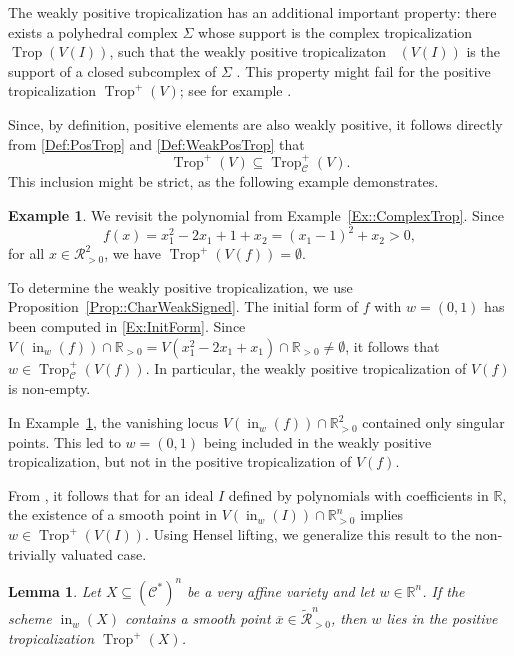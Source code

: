 \documentclass{article}
\newtheorem{lemma}[theorem]{Lemma}
\theoremstyle{definition}
\newtheorem{example}[theorem]{Example}
\DeclareMathOperator{\Trop}{Trop}
\DeclareMathOperator{\Tropw}{Trop_\mathcal{C}^+}
\newcommand{\R}{\mathbb{R}}
\newcommand{\RR}{\mathcal{R}}
\newcommand{\CC}{\mathcal{C}}
\newcommand{\inw}{\operatorname{in}_w}
\begin{document}
The weakly positive tropicalization has an additional important property: there exists a polyhedral complex $\Sigma$ whose support is the complex tropicalization $\Trop(V(I))$, such that the weakly positive tropicalizaton $\Tropw(V(I))$ is the support of a closed subcomplex of $\Sigma$ \cite[Corollary 2.4]{SpeyerWilliams::PosGrassmannian}. This property might fail for the positive tropicalization $\Trop^+(V)$; see for example \cite[Figure 7]{Alessandrini::LogLimit}.

Since, by definition, positive elements are also weakly positive, it follows directly from \eqref{Def:PosTrop} and \eqref{Def:WeakPosTrop} that
\[\Trop^+(V) \subseteq \Trop_\CC^+(V).\]
This inclusion might be strict, as the following example demonstrates.


\begin{example}
\label{Ex:SingTrop}
We revisit the polynomial from Example~\ref{Ex::ComplexTrop}. Since 
\[ f(x) =  x_1^2-2x_1+1 + x_2 = (x_1 - 1)^2 + x_2 > 0,\]
for all $x \in \mathcal{R}_{>0}^2$, we have $\Trop^+(V(f)) = \emptyset$.

To determine the weakly positive tropicalization, we use Proposition~\ref{Prop::CharWeakSigned}. The initial form of $f$ with $w = (0,1)$  has been computed in \eqref{Ex:InitForm}. Since $V(\inw(f)) \cap \mathbb{R}_{>0} = V(x_1^2 - 2x_1 +x_1)  \cap \mathbb{R}_{>0} \neq \emptyset$, it follows that $ w \in \Trop_{\mathcal{C}}^+(V(f))$. In particular, the weakly positive tropicalization of $V(f)$ is non-empty. 
\end{example}

In Example~\ref{Ex:SingTrop}, the vanishing locus $V(\inw(f)) \cap \mathbb{R}^2_{>0}$ contained only singular points.  This led to $w = (0,1)$ being included in the weakly positive tropicalization, but not in the positive tropicalization of $V(f)$.

From \cite[Lemma 2.6]{Vinzant::RealRadical}, it follows that for an ideal $I$ defined by polynomials with coefficients in $\mathbb{R}$, the existence of a smooth point in $V(\inw(I)) \cap \mathbb{R}^n_{>0}$ implies $w \in \Trop^+(V(I))$. Using Hensel lifting, we generalize this result to the non-trivially valuated case.

\begin{lemma}
\label{Lemma: Hensel lifting}
    Let $X\subseteq (\CC^*)^n$ be a very affine variety and let $w \in \R^n$. If the scheme $\inw(X)$ contains a smooth point $\overline{x} \in \widetilde{\RR}^n_{>0}$, then $w$ lies in the positive tropicalization $\Trop^+(X)$.
\end{lemma}
\end{document}
